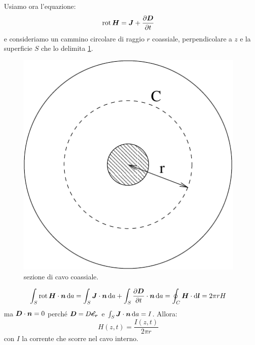 Usiamo ora l'equazione:
\begin{equation}
  \operatorname{rot}\boldsymbol{H}=\boldsymbol{J}+\frac{\partial\boldsymbol{D}}{\partial t}
\end{equation}
e consideriamo un cammino circolare di raggio $r$ coassiale, perpendicolare a $z$ e la superficie $S$ che lo delimita \ref{coassiali_02}.
\begin{figure}[htbp]
  \centering
  \includegraphics[scale=0.5]{immagini/fisica2/coassiali_02}
  \caption{sezione di cavo coassiale.}
  \label{coassiali_02}
\end{figure}
\begin{equation}
  \int_S\operatorname{rot}\boldsymbol{H}\cdot \boldsymbol{n}\,\mathrm{d} a=\int_S\boldsymbol{J}\cdot\boldsymbol{n}\,\mathrm{d} a+\int_S\frac{\partial\boldsymbol{D}}{\partial t}\cdot \boldsymbol{n}\,\mathrm{d} a=\oint_C\boldsymbol{H}\cdot\mathrm{d}\boldsymbol{l}=2\pi r H
\end{equation}
ma $\boldsymbol{D}\cdot\boldsymbol{n}=0$ perché $\boldsymbol{D}=D\boldsymbol{\hat {e_r}}$ e $\int_S\boldsymbol{J}\cdot\boldsymbol{n}\,\mathrm{d} a=I$. Allora:
\begin{equation}
  H(z,t)=\frac{I(z,t)}{2\pi r}
\end{equation}
con $I$ la corrente che scorre nel cavo interno.

